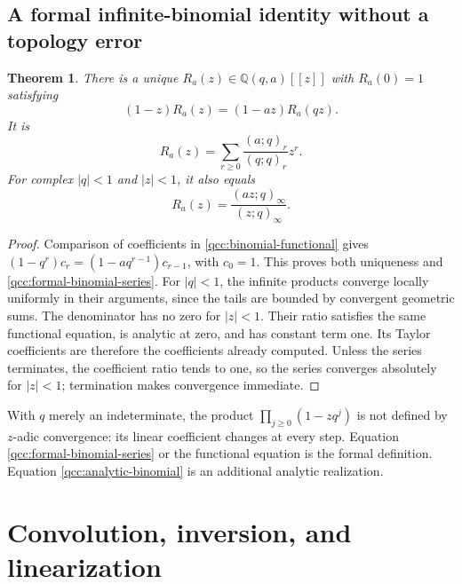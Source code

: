 \documentclass[11pt,a4paper,oneside,openany]{book}
\newtheorem{theorem}{Theorem}[chapter]
\theoremstyle{definition}
\theoremstyle{remark}
\newcommand{\Q}{\mathbb Q}
\begin{document}
\section{A formal infinite-binomial identity without a topology error}
\begin{theorem}\label{qcc:infinite-binomial}
There is a unique \(R_a(z)\in\Q(q,a)[[z]]\) with \(R_a(0)=1\) satisfying
\begin{equation}\label{qcc:binomial-functional}
 (1-z)R_a(z)=(1-az)R_a(qz).
\end{equation}
It is
\begin{equation}\label{qcc:formal-binomial-series}
 R_a(z)=\sum_{r\ge0}\frac{(a;q)_r}{(q;q)_r}z^r.
\end{equation}
For complex \(|q|<1\) and \(|z|<1\), it also equals
\begin{equation}\label{qcc:analytic-binomial}
 R_a(z)=\frac{(az;q)_\infty}{(z;q)_\infty}.
\end{equation}
\end{theorem}
\begin{proof}
Comparison of coefficients in \eqref{qcc:binomial-functional} gives
\((1-q^r)c_r=(1-aq^{r-1})c_{r-1}\), with \(c_0=1\).
This proves both uniqueness and \eqref{qcc:formal-binomial-series}.
For \(|q|<1\), the infinite products converge locally uniformly in their
arguments, since the tails are bounded by convergent geometric sums. The
denominator has no zero for \(|z|<1\). Their ratio satisfies the same functional
equation, is analytic at zero, and has constant term one. Its Taylor coefficients
are therefore the coefficients already computed. Unless the series terminates, the coefficient ratio tends
to one, so the series converges absolutely for \(|z|<1\); termination
makes convergence immediate.
\end{proof}
\begin{auditbox}
With \(q\) merely an indeterminate, the product
\(\prod_{j\ge0}(1-zq^j)\) is not defined by \(z\)-adic convergence: its linear
coefficient changes at every step. Equation \eqref{qcc:formal-binomial-series}
or the functional equation is the formal definition. Equation
\eqref{qcc:analytic-binomial} is an additional analytic realization.
\end{auditbox}

\chapter{Convolution, inversion, and linearization}
\label{qcc:convolution}
\end{document}
